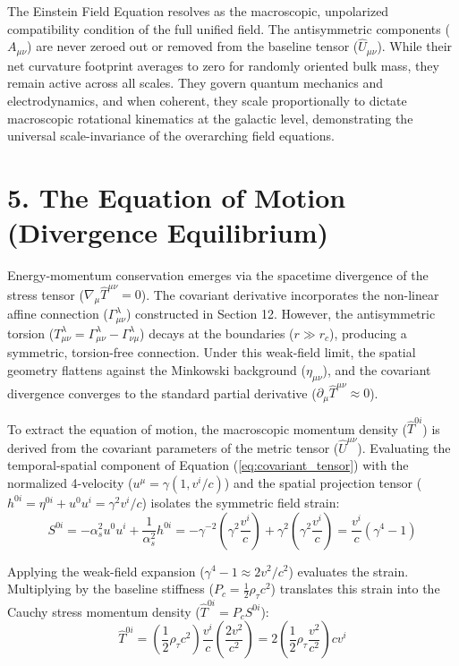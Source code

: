 The Einstein Field Equation resolves as the macroscopic, unpolarized compatibility condition of the full unified field. The antisymmetric components ($A_{\mu\nu}$) are never zeroed out or removed from the baseline tensor ($\hat{U}_{\mu\nu}$). While their net curvature footprint averages to zero for randomly oriented bulk mass, they remain active across all scales. They govern quantum mechanics and electrodynamics, and when coherent, they scale proportionally to dictate macroscopic rotational kinematics at the galactic level, demonstrating the universal scale-invariance of the overarching field equations.







\section*{5. The Equation of Motion (Divergence Equilibrium)}

Energy-momentum conservation emerges via the spacetime divergence of the stress tensor ($\nabla_\mu \hat{T}^{\mu\nu} = 0$). The covariant derivative incorporates the non-linear affine connection ($\Gamma^\lambda_{\mu\nu}$) constructed in Section 12. However, the antisymmetric torsion ($T^\lambda_{\mu\nu} = \Gamma^\lambda_{\mu\nu} - \Gamma^\lambda_{\nu\mu}$) decays at the boundaries ($r \gg r_c$), producing a symmetric, torsion-free connection. Under this weak-field limit, the spatial geometry flattens against the Minkowski background ($\eta_{\mu\nu}$), and the covariant divergence converges to the standard partial derivative ($\partial_\mu \hat{T}^{\mu\nu} \approx 0$). 

To extract the equation of motion, the macroscopic momentum density ($\hat{T}^{0i}$) is derived from the covariant parameters of the metric tensor ($\hat{U}^{\mu\nu}$). Evaluating the temporal-spatial component of Equation (\ref{eq:covariant_tensor}) with the normalized 4-velocity ($u^\mu = \gamma(1, v^i/c)$) and the spatial projection tensor ($h^{0i} = \eta^{0i} + u^0 u^i = \gamma^2 v^i/c$) isolates the symmetric field strain:
\begin{equation}
    S^{0i} = -\alpha_s^2 u^0 u^i + \frac{1}{\alpha_s^2} h^{0i} = -\gamma^{-2}\left(\gamma^2 \frac{v^i}{c}\right) + \gamma^2\left(\gamma^2 \frac{v^i}{c}\right) = \frac{v^i}{c}(\gamma^4 - 1)
\end{equation}

Applying the weak-field expansion ($\gamma^4 - 1 \approx 2v^2/c^2$) evaluates the strain. Multiplying by the baseline stiffness ($P_c = \frac{1}{2}\rho_\tau c^2$) translates this strain into the Cauchy stress momentum density ($\hat{T}^{0i} = P_c S^{0i}$):
\begin{equation}
    \hat{T}^{0i} = \left(\frac{1}{2}\rho_\tau c^2\right) \frac{v^i}{c} \left(\frac{2v^2}{c^2}\right) = 2\left(\frac{1}{2} \rho_\tau \frac{v^2}{c^2}\right) c v^i 
\end{equation}

